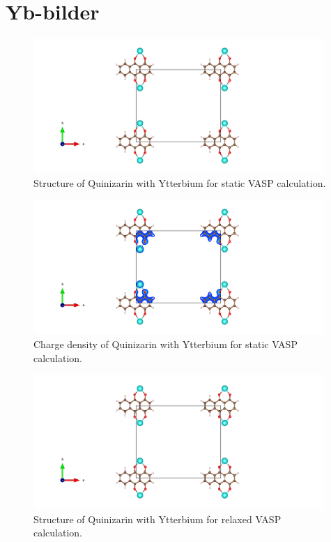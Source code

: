 \documentclass{article}
\begin{document}
\vspace{1cm}

\section{Yb-bilder}

  \begin{figure}[H]
      \centering
      \includegraphics[width = 11cm]{../fig/Yb_staticbefore_CONTCAR.png}
      \caption{Structure of Quinizarin with Ytterbium for static VASP calculation. }
      \label{fig:Yb_staticbefore_CONTCAR}
  \end{figure}

  \begin{figure}[H]
      \centering
      \includegraphics[width = 11cm]{../fig/Yb_staticbefore_CHGCAR.png}
      \caption{Charge density of Quinizarin with Ytterbium for static VASP calculation. }
      \label{fig:Yb_staticbefore_CHGCAR}
  \end{figure}

  \begin{figure}[H]
      \centering
      \includegraphics[width = 11cm]{../fig/Yb_relax_CONTCAR.png}
      \caption{Structure of Quinizarin with Ytterbium for relaxed VASP calculation. }
      \label{fig:Yb_relax_CONTCAR}
  \end{figure}
\end{document}
